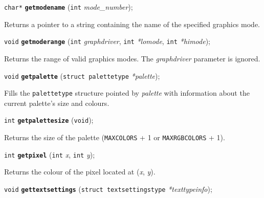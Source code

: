 \documentclass[a4paper,12pt]{article}
\newcommand{\V}{\texttt{void}}      %
\newcommand{\I}{\texttt{int}}       %
\newcommand{\func}[1]{\textbf{\texttt{#1}}}  %
\newcommand{\A}[1]{\emph{#1}}       %
\newcommand{\T}[1]{\texttt{#1}}     %
\newenvironment{bgi}
{ %
  \begin{snugshade}
}
{ %
  \end{snugshade}
}
\begin{document}
\begin{bgi}
\texttt{char*} \func{getmodename} (\I{} \A{mode\_number});
\end{bgi}

Returns a pointer to a string containing the name of the specified
graphics mode.


\label{sec:getmoderange}

\begin{bgi}
\V{} \func{getmoderange} (\I{} \A{graphdriver}, \I{} \A{*lomode}, \I{}
\A{*himode});
\end{bgi}

Returns the range of valid graphics modes. The \A{graphdriver} parameter
is ignored.


\label{sec:getpalette}

\begin{bgi}
\V{} \func{getpalette} (\texttt{struct palettetype} \A{*palette});
\end{bgi}

Fills the \texttt{palettetype} structure pointed by \A{palette} with
information about the current palette's size and colours.


\label{sec:getpalettesize}

\begin{bgi}
\I{} \func{getpalettesize} (\V{});
\end{bgi}

Returns the size of the palette (\T{MAXCOLORS} + 1 or
\T{MAXRGB\-COLORS} + 1).


\label{sec:getpixel}

\begin{bgi}
\I{} \func{getpixel} (\I{} \A{x}, \I{} \A{y});
\end{bgi}

Returns the colour of the pixel located at (\A{x}, \A{y}).


\label{sec:gettextsettings}

\begin{bgi}
\V{} \func{gettextsettings} (\texttt{struct textsettingstype}
\A{*texttypeinfo});
\end{bgi}
\end{document}
